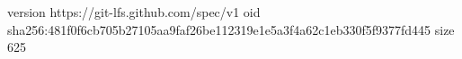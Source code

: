 version https://git-lfs.github.com/spec/v1
oid sha256:481f0f6cb705b27105aa9faf26be112319e1e5a3f4a62c1eb330f5f9377fd445
size 625
